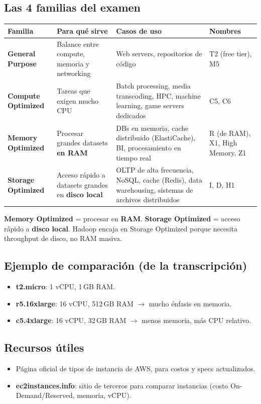 \documentclass[11pt,a4paper]{article}
\let\oldsubsection\subsection
\renewcommand{\subsection}{\Needspace{6\baselineskip}\oldsubsection}
\begin{document}
\subsection{Las 4 familias del examen}
\begin{tabularx}{\linewidth}{@{}>{\bfseries}l L L l@{}}
\toprule
Familia & Para qué sirve & Casos de uso & Nombres \\
\midrule
General Purpose & Balance entre compute, memoria y networking & Web servers, repositorios de código & T2 (free tier), M5 \\
\addlinespace
Compute Optimized & Tareas que exigen mucho CPU & Batch processing, media transcoding, HPC, machine learning, game servers dedicados & C5, C6 \\
\addlinespace
Memory Optimized & Procesar grandes datasets \textbf{en RAM} & DBs en memoria, cache distribuido (ElastiCache), BI, procesamiento en tiempo real & R (de RAM), X1, High Memory, Z1 \\
\addlinespace
Storage Optimized & Acceso rápido a datasets grandes en \textbf{disco local} & OLTP de alta frecuencia, NoSQL, cache (Redis), data warehousing, sistemas de archivos distribuidos & I, D, H1 \\
\bottomrule
\end{tabularx}

\begin{nota}[title=Distinción clave]
\textbf{Memory Optimized} = procesar en \textbf{RAM}. \textbf{Storage Optimized} = acceso rápido a \textbf{disco local}. Hadoop encaja en Storage Optimized porque necesita throughput de disco, no RAM masiva.
\end{nota}

\subsection{Ejemplo de comparación (de la transcripción)}
\begin{itemize}
  \item \textbf{t2.micro}: 1 vCPU, 1\,GB RAM.
  \item \textbf{r5.16xlarge}: 16 vCPU, 512\,GB RAM $\rightarrow$ mucho énfasis en memoria.
  \item \textbf{c5.4xlarge}: 16 vCPU, 32\,GB RAM $\rightarrow$ menos memoria, más CPU relativo.
\end{itemize}

\subsection{Recursos útiles}
\begin{itemize}
  \item Página oficial de tipos de instancia de AWS, para costos y specs actualizados.
  \item \textbf{ec2instances.info}: sitio de terceros para comparar instancias (costo On-Demand/Reserved, memoria, vCPU).
\end{itemize}
\end{document}
